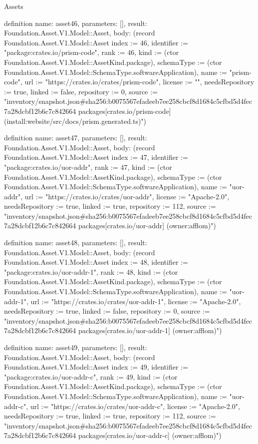 \begin{lexlean}{Assets}
\begin{semanticmodule}
definition{
  name: asset46,
  parameters: [],
  result: Foundation.Asset.V1.Model::Asset,
  body: (record Foundation.Asset.V1.Model::Asset {index := 46, identifier := "package:crates.io/prism-code", rank := 46, kind := (ctor Foundation.Asset.V1.Model::AssetKind.package), schemaType := (ctor Foundation.Asset.V1.Model::SchemaType.softwareApplication), name := "prism-code", url := "https://crates.io/crates/prism-code", license := "", needsRepository := true, linked := false, repository := 0, source := "inventory/snapshot.json#sha256:b0075567efadeeb7ee258cbcf8d1684c5cfbd5d4fec7a28dcbf12b6c7c842664 packages[crates.io/prism-code] (install:website/src/docs/prism.generated.ts)"})
}

definition{
  name: asset47,
  parameters: [],
  result: Foundation.Asset.V1.Model::Asset,
  body: (record Foundation.Asset.V1.Model::Asset {index := 47, identifier := "package:crates.io/uor-addr", rank := 47, kind := (ctor Foundation.Asset.V1.Model::AssetKind.package), schemaType := (ctor Foundation.Asset.V1.Model::SchemaType.softwareApplication), name := "uor-addr", url := "https://crates.io/crates/uor-addr", license := "Apache-2.0", needsRepository := true, linked := true, repository := 112, source := "inventory/snapshot.json#sha256:b0075567efadeeb7ee258cbcf8d1684c5cfbd5d4fec7a28dcbf12b6c7c842664 packages[crates.io/uor-addr] (owner:afflom)"})
}

definition{
  name: asset48,
  parameters: [],
  result: Foundation.Asset.V1.Model::Asset,
  body: (record Foundation.Asset.V1.Model::Asset {index := 48, identifier := "package:crates.io/uor-addr-1", rank := 48, kind := (ctor Foundation.Asset.V1.Model::AssetKind.package), schemaType := (ctor Foundation.Asset.V1.Model::SchemaType.softwareApplication), name := "uor-addr-1", url := "https://crates.io/crates/uor-addr-1", license := "Apache-2.0", needsRepository := true, linked := false, repository := 0, source := "inventory/snapshot.json#sha256:b0075567efadeeb7ee258cbcf8d1684c5cfbd5d4fec7a28dcbf12b6c7c842664 packages[crates.io/uor-addr-1] (owner:afflom)"})
}

definition{
  name: asset49,
  parameters: [],
  result: Foundation.Asset.V1.Model::Asset,
  body: (record Foundation.Asset.V1.Model::Asset {index := 49, identifier := "package:crates.io/uor-addr-c", rank := 49, kind := (ctor Foundation.Asset.V1.Model::AssetKind.package), schemaType := (ctor Foundation.Asset.V1.Model::SchemaType.softwareApplication), name := "uor-addr-c", url := "https://crates.io/crates/uor-addr-c", license := "Apache-2.0", needsRepository := true, linked := true, repository := 112, source := "inventory/snapshot.json#sha256:b0075567efadeeb7ee258cbcf8d1684c5cfbd5d4fec7a28dcbf12b6c7c842664 packages[crates.io/uor-addr-c] (owner:afflom)"})
}


\end{semanticmodule}
\end{lexlean}
